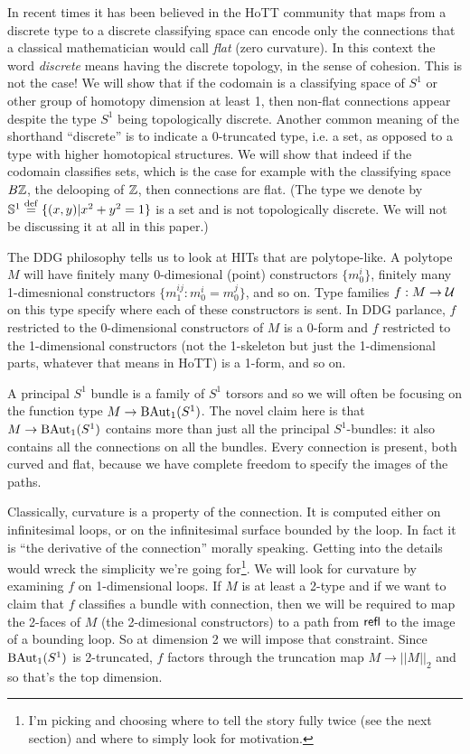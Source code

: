 \documentclass[12pt]{article}
\begin{document}
In recent times it has been believed in the HoTT community that maps from a discrete type to a discrete classifying space can encode only the connections that a classical mathematician would call \emph{flat} (zero curvature). In this context the word \emph{discrete} means having the discrete topology, in the sense of cohesion\cite{shulman_cohesion}. This is not the case! We will show that if the codomain is a classifying space of \( S^1 \) or other group of homotopy dimension at least 1, then non-flat connections appear despite the type \( S^1 \) being topologically discrete. Another common meaning of the shorthand ``discrete'' is to indicate a 0-truncated type, i.e. a set, as opposed to a type with higher homotopical structures. We will show that indeed if the codomain classifies sets, which is the case for example with the classifying space \( B\mathbb{Z} \), the delooping of \( \mathbb{Z} \), then connections are flat. (The type we denote by \( \mathbb{S}^1\stackrel{\mathrm{def}}{=}\{(x, y)|x^2+y^2=1\} \) is a set and is not topologically discrete. We will not be discussing it at all in this paper.)

The DDG philosophy tells us to look at HITs that are polytope-like. A polytope \( M \) will have finitely many 0-dimesional (point) constructors \( \{m_0^i\} \), finitely many 1-dimesnional constructors \( \{m_1^{ij}:m_0^i=m_0^j\} \), and so on. Type families \( f:M\to \mathcal{U} \) on this type specify where each of these constructors is sent. In DDG parlance, \( f \) restricted to the 0-dimensional constructors of \( M \) is a 0-form and \( f \) restricted to the 1-dimensional constructors (not the 1-skeleton but just the 1-dimensional parts, whatever that means in HoTT) is a 1-form, and so on.

A principal \( S^1 \) bundle is a family of \( S^1 \) torsors and so we will often be focusing on the function type \( M\to \mathrm{BAut}_1(S^1) \). The novel claim here is that \( M\to \mathrm{BAut}_1(S^1) \) contains more than just all the principal \( S^1 \)-bundles: it also contains all the connections on all the bundles. Every connection is present, both curved and flat, because we have complete freedom to specify the images of the paths.

Classically, curvature is a property of the connection. It is computed either on infinitesimal loops, or on the infinitesimal surface bounded by the loop. In fact it is ``the derivative of the connection'' morally speaking. Getting into the details would wreck the simplicity we're going for\footnote{I'm picking and choosing where to tell the story fully twice (see the next section) and where to simply look for motivation.}. We will look for curvature by examining \( f \) on 1-dimensional loops. If \( M \) is at least a 2-type and if we want to claim that \( f \) classifies a bundle with connection, then we will be required to map the 2-faces of \( M \) (the 2-dimesional constructors) to a path from \( \mathsf{refl} \) to the image of a bounding loop. So at dimension 2 we will impose that constraint. Since \( \mathrm{BAut}_1(S^1) \) is 2-truncated, \( f \) factors through the truncation map \( M\to||M||_2 \) and so that's the top dimension.
\end{document}
